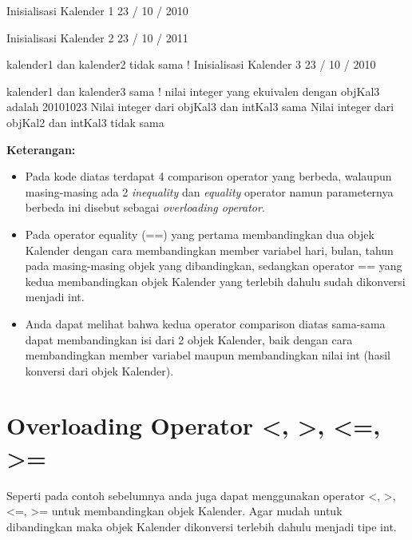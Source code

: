 \begin{lcverbatim}
Inisialisasi Kalender 1
23 / 10 / 2010

Inisialisasi Kalender 2
23 / 10 / 2011

kalender1 dan kalender2 tidak sama !
Inisialisasi Kalender 3
23 / 10 / 2010

kalender1 dan kalender3 sama !
nilai integer yang ekuivalen dengan objKal3 adalah 20101023
Nilai integer dari objKal3 dan intKal3 sama
Nilai integer dari objKal2 dan intKal3 tidak sama
\end{lcverbatim}

\textbf{Keterangan:}

\begin{itemize}

\item
  Pada kode diatas terdapat 4 comparison operator yang berbeda, walaupun
  masing-masing ada 2 \emph{inequality} dan \emph{equality} operator
  namun parameternya berbeda ini disebut sebagai \emph{overloading
  operator}.
\item
  Pada operator equality (==) yang pertama membandingkan dua objek
  Kalender dengan cara membandingkan member variabel hari, bulan, tahun
  pada masing-masing objek yang dibandingkan, sedangkan operator == yang
  kedua membandingkan objek Kalender yang terlebih dahulu sudah
  dikonversi menjadi int.
\item
  Anda dapat melihat bahwa kedua operator comparison diatas sama-sama
  dapat membandingkan isi dari 2 objek Kalender, baik dengan cara
  membandingkan member variabel maupun membandingkan nilai int (hasil
  konversi dari objek Kalender).
\end{itemize}

\section{Overloading Operator \textless{}, \textgreater{}, \textless{}=, \textgreater{}=}\label{overloading-operator}

Seperti pada contoh sebelumnya anda juga dapat menggunakan operator
\textless{}, \textgreater{}, \textless{}=, \textgreater{}= untuk
membandingkan objek Kalender. Agar mudah untuk dibandingkan maka objek
Kalender dikonversi terlebih dahulu menjadi tipe int.


